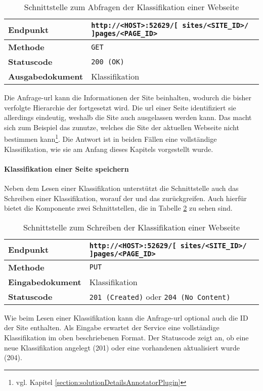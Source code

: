     \begin{table}[htb]
        \centering
        \begin{tabular}{|l|l|}
        \hline
        \textbf{Endpunkt} & \texttt{http://<HOST>:52629/[ sites/<SITE\_ID>/ ]pages/<PAGE\_ID>}\\
        \hline
        \textbf{Methode} & \texttt{GET}\\
        \hline
        \textbf{Statuscode} & \texttt{200 (OK)}\\
        \hline
        \textbf{Ausgabedokument} & Klassifikation\\
        \hline
        \end{tabular}
        \caption{Schnittstelle zum Abfragen der Klassifikation einer Webseite}
        \label{table:getFullPageInterface}
    \end{table}

    Die Anfrage-\gls{url} kann die Informationen der Site beinhalten,
    wodurch die bisher verfolgte Hierarchie der {\resources} fortgesetzt wird.
    Die \gls{url} einer Seite identifiziert sie allerdings eindeutig,
    weshalb die Site auch ausgelassen werden kann.
    Das macht sich zum Beispiel das {\annotatorPlugin} zunutze,
    welches die Site der aktuellen Webseite nicht bestimmen
    kann\footnote{vgl. Kapitel \ref{section:solutionDetailsAnnotatorPlugin}}.
    Die Antwort ist in beiden Fällen eine vollständige Klassifikation,
    wie sie am Anfang dieses Kapitels vorgestellt wurde.

    \paragraph{Klassifikation einer Seite speichern}
    Neben dem Lesen einer Klassifikation unterstützt die Schnittstelle auch das Schreiben einer Klassifikation,
    worauf der {\classificationService} und das {\annotatorPlugin} zurückgreifen.
    Auch hierfür bietet die Komponente zwei Schnittstellen, die in Tabelle \ref{table:writePageInterface} zu sehen sind.

    \begin{table}[htb]
        \centering
        \begin{tabular}{|l|l|}
        \hline
        \textbf{Endpunkt} & \texttt{http://<HOST>:52629/[ sites/<SITE\_ID>/ ]pages/<PAGE\_ID>}\\
        \hline
        \textbf{Methode} & \texttt{PUT}\\
        \hline
        \textbf{Eingabedokument} & Klassifikation\\
        \hline
        \textbf{Statuscode} & \texttt{201 (Created)} oder \texttt{204 (No Content)}\\
        \hline
        \end{tabular}
        \caption{Schnittstelle zum Schreiben der Klassifikation einer Webseite}
        \label{table:writePageInterface}
    \end{table}

    Wie beim Lesen einer Klassifikation kann die Anfrage-\gls{url} optional auch die ID der Site enthalten.
    Als Eingabe erwartet der Service eine vollständige Klassifikation im oben beschriebenen Format.
    Der Statuscode zeigt an, ob eine neue Klassifikation angelegt (201) oder eine vorhandenen aktualisiert wurde (204).
